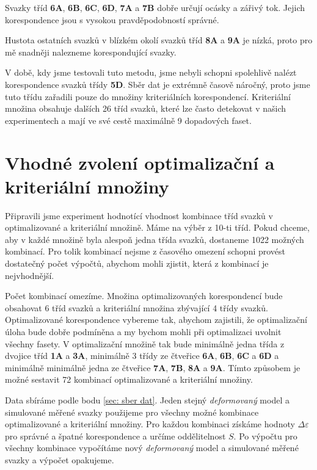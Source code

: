Svazky tříd \textbf{6A}, \textbf{6B}, \textbf{6C}, \textbf{6D}, \textbf{7A} a \textbf{7B} dobře určují ocásky a zářivý tok. Jejich korespondence jsou s vysokou pravděpodobností správné. 

Hustota ostatních svazků v blízkém okolí svazků tříd \textbf{8A} a \textbf{9A} je nízká, proto pro mě snadněji nalezneme korespondující svazky. 

V době, kdy jsme testovali tuto metodu, jsme nebyli schopni spolehlivě nalézt korespondence svazků třídy \textbf{5D}. Sběr dat je extrémně časově náročný, proto jsme tuto třídu zařadili pouze do množiny kriteriálních korespondencí. Kriteriální množina obsahuje dalších 26 tříd svazků, které lze často detekovat v našich experimentech a mají ve své cestě maximálně 9 dopadových faset. 


\section{Vhodné zvolení optimalizační a kriteriální množiny}
\label{sec: vhodnostOpt}
	Připravili jsme experiment hodnotící vhodnost kombinace tříd svazků v optimalizované a kriteriální množině. Máme na výběr z 10-ti tříd. Pokud chceme, aby v každé množině byla alespoň jedna třída svazků, dostaneme 1022 možných kombinací. Pro tolik kombinací nejsme z časového omezení schopni provést dostatečný počet výpočtů, abychom mohli zjistit, která z kombinací je nejvhodnější. 

	Počet kombinací omezíme. Množina optimalizovaných korespondencí bude obsahovat 6 tříd svazků a kriteriální množina zbývající 4 třídy svazků. Optimalizované korespondence vybereme tak, abychom zajistili, že optimalizační úloha bude dobře podmíněna a my bychom mohli při optimalizaci uvolnit všechny fasety. V optimalizační množině tak bude  minimálně jedna třída z dvojice tříd \textbf{1A} a \textbf{3A}, minimálně 3 třídy ze čtveřice \textbf{6A}, \textbf{6B}, \textbf{6C} a \textbf{6D} a minimálně minimálně jedna ze čtveřice \textbf{7A}, \textbf{7B}, \textbf{8A} a \textbf{9A}. Tímto způsobem je možné sestavit 72 kombinací optimalizované a kriteriální množiny. 
	
	Data sbíráme podle bodu \ref{sec: sber dat}. Jeden stejný \textit{deformovaný} model a simulované měřené svazky použijeme pro všechny možné kombinace optimalizované a kriteriální množiny. Pro každou kombinaci získáme hodnoty $\Delta\varepsilon$ pro správné a špatné korespondence a určíme oddělitelnost $S$. Po výpočtu pro všechny kombinace vypočítáme nový \textit{deformovaný} model a simulované měřené svazky a výpočet opakujeme. 
	
